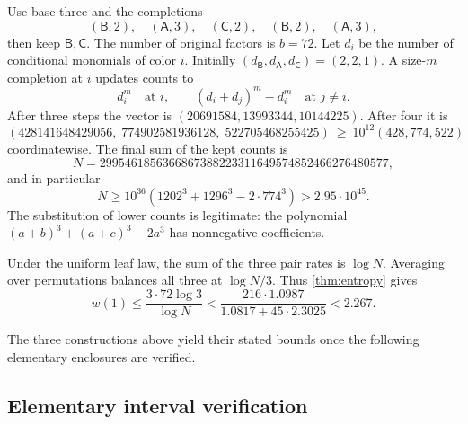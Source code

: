 \documentclass[11pt]{article}
\numberwithin{equation}{section}
\theoremstyle{definition}
\theoremstyle{remark}
\newcommand{\colA}{\mathsf A}
\newcommand{\colB}{\mathsf B}
\newcommand{\colC}{\mathsf C}
\begin{document}
Use base three and the completions
\[
 (\colB,2),\quad(\colA,3),\quad(\colC,2),\quad
 (\colB,2),\quad(\colA,3),
\]
then keep \(\colB,\colC\).
The number of original factors is \(b=72\).
Let \(d_i\) be the number of conditional monomials of color \(i\).
Initially \((d_{\colB},d_{\colA},d_{\colC})=(2,2,1)\).
A size-\(m\) completion at \(i\) updates counts to
\[
 d_i^m\quad\text{at }i,\qquad
 (d_i+d_j)^m-d_i^m\quad\text{at }j\ne i.
\]
After three steps the vector is
\((20691584,13993344,10144225)\).
After four it is
\[
 (428141648429056,\;774902581936128,\;522705468255425)
 \ \ge\ 10^{12}(428,774,522)
\]
coordinatewise.
The final sum of the kept counts is
\[
 N=2995461856366867388223311649574852466276480577,
\]
and in particular
\begin{equation}\label{eq:square-count-lower}
 N\ge 10^{36}
      (1202^3+1296^3-2\cdot774^3)>2.95\cdot10^{45}.
\end{equation}
The substitution of lower counts is legitimate: the polynomial
\((a+b)^3+(a+c)^3-2a^3\) has nonnegative coefficients.

Under the uniform leaf law, the sum of the three pair rates is
\(\log N\).
Averaging over permutations balances all three at \(\log N/3\).
Thus \cref{thm:entropy} gives
\[
 w(1)\le \frac{3\cdot72\log3}{\log N}
 <\frac{216\cdot1.0987}{1.0817+45\cdot2.3025}
 <2.267.
\]

\noindent The three constructions above yield their stated bounds
once the following elementary enclosures are verified.

\subsection{Elementary interval verification}\label{subsec:log-certificate}
\end{document}
